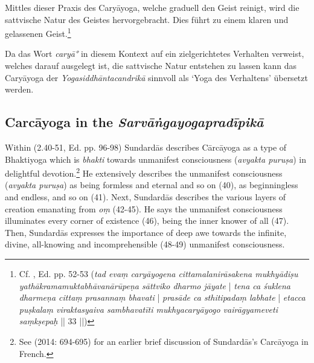  Mittles dieser Praxis des Caryāyoga, welche graduell den Geist reinigt, wird die sattvische Natur des Geistes hervorgebracht. Dies führt zu einem klaren und gelassenen Geist.\footnote{Cf. , Ed. pp. 52-53 (\textit{tad evaṃ caryāyogena cittamalanirāsakena mukhyādiṣu yathākramamuktabhāvanārūpeṇa sāttviko dharmo jāyate} | \textit{tena ca śuklena dharmeṇa cittaṃ prasannaṃ bhavati} | \textit{prasāde ca sthitipadaṃ labhate} | \textit{etacca puṣkalaṃ viraktasyaiva sambhavatīti mukhyacaryāyogo vairāgyameveti saṃkṣepaḥ} || 33 ||)}

 Da das Wort \textit{caryā°} in diesem Kontext auf ein zielgerichtetes Verhalten verweist, welches darauf ausgelegt ist, die sattvische Natur entstehen zu lassen kann das Caryāyoga der \textit{Yogasiddhāntacandrikā} sinnvoll als `Yoga des Verhaltens' übersetzt werden.  

\subsection{Carcāyoga in the \textit{Sarvāṅgayogapradīpikā}}

Within  (2.40-51, Ed. pp. 96-98) Sundardās describes Cārcāyoga as a type of Bhaktiyoga which is \textit{bhakti} towards unmanifest consciousness (\textit{avyakta puruṣa}) in delightful devotion.\footnote{See \citeauthor{burger2014sarvangayogapradipika} (2014: 694-695) for an earlier brief discussion of Sundardās's Carcāyoga in French.} He extensively describes the unmanifest consciousness (\textit{avyakta puruṣa}) as being formless and eternal and so on (40), as beginningless and endless, and so on (41). Next, Sundardās describes the various layers of creation emanating from \textit{oṃ} (42-45). He says the unmanifest consciousness illuminates every corner of existence (46), being the inner knower of all (47). Then, Sundardās expresses the importance of deep awe towards the infinite, divine, all-knowing and incomprehensible (48-49) unmanifest consciousness.

